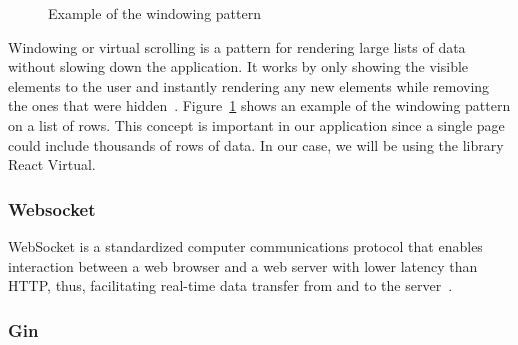 \begin{figure}[H]
      \centerfloat
      \sffamily

      \caption{Example of the windowing pattern}
      \label{fig:windowing-example}
\end{figure}

Windowing or virtual scrolling is a pattern for rendering large lists of data without slowing down the application.
It works by only showing the visible elements to the user and instantly rendering any new elements while removing the ones that were hidden~\autocite{osmani_rendering_nodate}.
Figure~\ref{fig:windowing-example} shows an example of the windowing pattern on a list of rows.
This concept is important in our application since a single page could include thousands of rows of data. In our case, we will be using the library React Virtual.

\subsubsection{Websocket}

WebSocket is a standardized computer communications protocol that enables interaction between a web browser and a web server with lower latency than HTTP, thus, facilitating real-time data transfer from and to the server~\autocite{ubl_introducing_nodate}.

\subsubsection{Gin}

